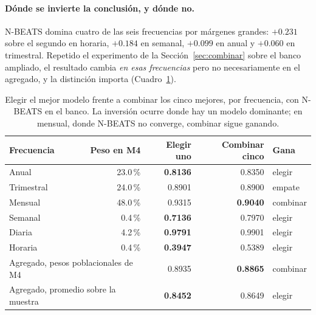 \paragraph{Dónde se invierte la conclusión, y dónde no.} N-BEATS domina cuatro de las
seis frecuencias por márgenes grandes: $+0.231$ sobre el segundo en horaria, $+0.184$ en
semanal, $+0.099$ en anual y $+0.060$ en trimestral. Repetido el experimento de la
Sección~\ref{sec:combinar} sobre el banco ampliado, el resultado cambia \emph{en esas
frecuencias} pero no necesariamente en el agregado, y la distinción importa
(Cuadro~\ref{tab:inversion}).

\begin{table}[htbp]
\centering
\caption{Elegir el mejor modelo frente a combinar los cinco mejores, por frecuencia, con
N-BEATS en el banco. La inversión ocurre donde hay un modelo dominante; en mensual, donde
N-BEATS no converge, combinar sigue ganando.}
\label{tab:inversion}
\begin{tabular}{lrrrl}
\toprule
\textbf{Frecuencia} & \textbf{Peso en M4} & \textbf{Elegir uno} &
\textbf{Combinar cinco} & \textbf{Gana} \\
\midrule
Anual      & 23.0\,\% & \textbf{0.8136} & 0.8350 & elegir \\
Trimestral & 24.0\,\% & 0.8901 & 0.8900 & empate \\
Mensual    & 48.0\,\% & 0.9315 & \textbf{0.9040} & combinar \\
Semanal    &  0.4\,\% & \textbf{0.7136} & 0.7970 & elegir \\
Diaria     &  4.2\,\% & \textbf{0.9791} & 0.9901 & elegir \\
Horaria    &  0.4\,\% & \textbf{0.3947} & 0.5389 & elegir \\
\midrule
\multicolumn{2}{l}{Agregado, pesos poblacionales de M4} & 0.8935 & \textbf{0.8865} & combinar \\
\multicolumn{2}{l}{Agregado, promedio sobre la muestra} & \textbf{0.8452} & 0.8649 & elegir \\
\bottomrule
\end{tabular}
\end{table}

